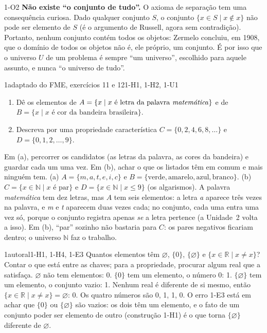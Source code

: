 \begin{obs}{1-O2}
\textbf{Não existe \enquote{o conjunto de tudo}.} O axioma de separação tem uma consequência curiosa. Dado qualquer conjunto $S$, o conjunto $\{x\in S\mid x\notin x\}$ não pode ser elemento de $S$ (é o argumento de Russell, agora sem contradição). Portanto, nenhum conjunto contém todos os objetos: Zermelo concluiu, em 1908, que o domínio de todos os objetos não é, ele próprio, um conjunto. É por isso que o universo $U$ de um problema é sempre \enquote{um universo}, escolhido para aquele assunto, e nunca \enquote{o universo de tudo}.
\end{obs}

\Exemplos

\begin{exemplo}{}{1}{adaptado do FME, exercícios 11 e 12}{1-H1, 1-H2, 1-U1}
\label{ex:u1:listar}
\begin{enumerate}[label=\alph*)]
  \item Dê os elementos de $A=\{x\mid x\text{ é letra da palavra \emph{matemática}}\}$ e de $B=\{x\mid x\text{ é cor da bandeira brasileira}\}$.
  \item Descreva por uma propriedade característica $C=\{0,2,4,6,8,\ldots\}$ e $D=\{0,1,2,\ldots,9\}$.
\end{enumerate}
\plano Em (a), percorrer os candidatos (as letras da palavra, as cores da bandeira) e guardar cada um uma vez. Em (b), achar o que os listados têm em comum e mais ninguém tem.
\resolucao (a) $A=\{m,a,t,e,i,c\}$ e $B=\{\text{verde},\text{amarelo},\text{azul},\text{branco}\}$. (b) $C=\{x\in\mathbb{N}\mid x\text{ é par}\}$ e $D=\{x\in\mathbb{N}\mid x\le 9\}$ (os algarismos).
\comentario A palavra \emph{matemática} tem dez letras, mas $A$ tem seis elementos: a letra \emph{a} aparece três vezes na palavra, e \emph{m} e \emph{t} aparecem duas vezes cada; no conjunto, cada uma entra uma vez só, porque o conjunto registra apenas \emph{se} a letra pertence (a Unidade~2 volta a isso). Em (b), \enquote{par} sozinho não bastaria para $C$: os pares negativos ficariam dentro; o universo $\mathbb{N}$ faz o trabalho.
\end{exemplo}

\begin{exemplo}{}{1}{autoral}{1-H1, 1-H4, 1-E3}
\label{ex:u1:vazio}
Quantos elementos têm $\varnothing$, $\{0\}$, $\{\varnothing\}$ e $\{x\in\mathbb{R}\mid x\neq x\}$?
\plano Contar o que está entre as chaves; para a propriedade, procurar algum real que a satisfaça.
\resolucao $\varnothing$ não tem elementos: 0. $\{0\}$ tem um elemento, o número 0: 1. $\{\varnothing\}$ tem um elemento, o conjunto vazio: 1. Nenhum real é diferente de si mesmo, então $\{x\in\mathbb{R}\mid x\neq x\}=\varnothing$: 0.
\comentario Os quatro números são 0, 1, 1, 0. O erro 1-E3 está em achar que $\{0\}$ ou $\{\varnothing\}$ são vazios: os dois têm um elemento, e o fato de um conjunto poder ser elemento de outro (construção 1-H1) é o que torna $\{\varnothing\}$ diferente de $\varnothing$.
\end{exemplo}

